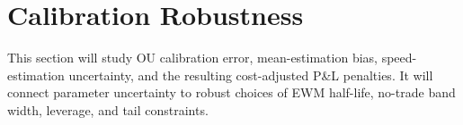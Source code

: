 \section{Calibration Robustness}

This section will study OU calibration error, mean-estimation bias, speed-estimation uncertainty, and the resulting cost-adjusted P\&L penalties. It will connect parameter uncertainty to robust choices of EWM half-life, no-trade band width, leverage, and tail constraints.
